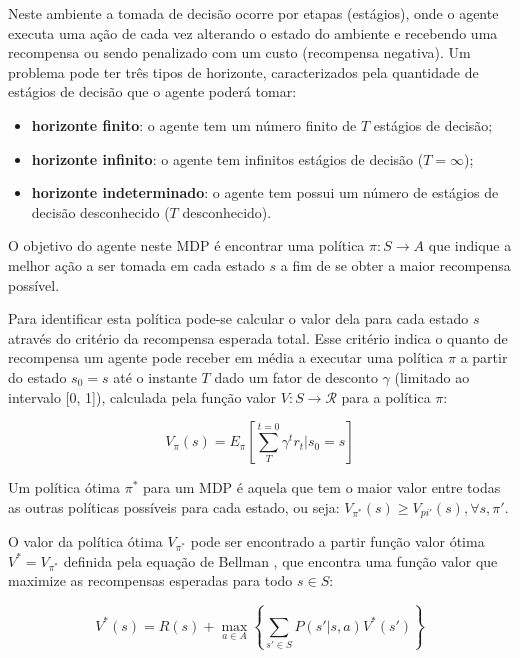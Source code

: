 \documentclass[letterpaper]{article}
\begin{document}
Neste ambiente a tomada de decisão ocorre por etapas (estágios), onde o agente executa uma ação de cada vez alterando o estado do ambiente e recebendo uma recompensa ou sendo penalizado com um custo (recompensa negativa). Um problema pode ter três tipos de horizonte, caracterizados pela quantidade de estágios de decisão que o agente poderá tomar:

\begin{itemize}
    \item \textbf{horizonte finito}: o agente tem um número finito de $T$ estágios de decisão;
    \item \textbf{horizonte infinito}: o agente tem infinitos estágios de decisão ($T = \infty$);
    \item \textbf{horizonte indeterminado}: o agente tem possui um número de estágios de decisão desconhecido ($T$ desconhecido).
\end{itemize}

O objetivo do agente neste MDP é encontrar uma política $\pi : S \rightarrow A$ que indique a melhor ação a ser tomada em cada estado $s$ a fim de se obter a maior recompensa possível.

Para identificar esta política pode-se calcular o valor dela para cada estado $s$ através do critério da recompensa esperada total. Esse critério indica o quanto de recompensa um agente pode receber em média a executar uma política $\pi$ a partir do estado $s_0 = s$ até o instante $T$ dado um fator de desconto $\gamma$ (limitado ao intervalo [0, 1]), calculada pela função valor $V : S \rightarrow \mathcal{R} $ para a política $\pi$:

\begin{equation} \label{eq:total_expected_reward}
    V_\pi(s) = E_\pi \left[ \sum_{T}^{t=0} \gamma^t r_t | s_0 = s \right]
\end{equation}

Um política ótima $\pi^*$ para um MDP é aquela que tem o maior valor entre todas as outras políticas possíveis para cada estado, ou seja: $V_{\pi^*}(s) \geq V_{pi'}(s), \forall s,\pi'$.

O valor da política ótima $V_{\pi^*}$ pode ser encontrado a partir função valor ótima $V^* = V_{\pi^*}$ definida pela equação de Bellman \cite{Bellman-1966}, que encontra uma função valor que maximize as recompensas esperadas para todo $s \in S$:

\begin{equation} \label{eq:bellman_equation}
    V^*(s) = R(s) + \max_{a \in A} \left\{ \sum_{s'\in S} P(s'|s,a)V^*(s') \right\}
\end{equation}
\end{document}
